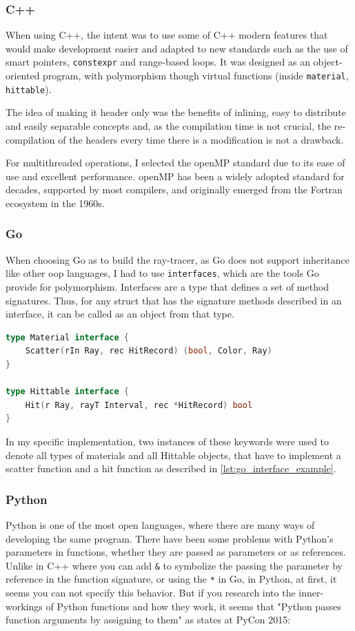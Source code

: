 \subsubsection{C++}
When using C++, the intent was to use some of C++ modern features that would make development easier and adapted to new standards such as the use of smart pointers, \texttt{constexpr} and range-based loops. It was designed as an object-oriented program, with polymorphism though virtual functions (inside \texttt{material}, \texttt{hittable}).

The idea of making it header only was the benefits of inlining, easy to distribute and easily separable concepts and, as the compilation time is not crucial, the re-compilation of the headers every time there is a modification is not a drawback.

For multithreaded operations, I selected the \gls{openMP} standard due to its ease of use and excellent performance. \gls{openMP} has been a widely adopted standard for decades, supported by most compilers, and originally emerged from the Fortran ecosystem in the 1960s.

\subsubsection{Go}
When choosing Go as to build the ray-tracer, as Go does not support inheritance like other \gls{oop} languages, I had to use \texttt{interfaces}, which are the tools Go provide for polymorphism. Interfaces are a type that defines a set of method signatures. Thus, for any struct that has the signature methods described in an interface, it can be called as an object from that type.

\begin{lstlisting}[language=Go, caption={Go interface example.}, label={lst:go_interface_example}
]
type Material interface {
	Scatter(rIn Ray, rec HitRecord) (bool, Color, Ray)
}

type Hittable interface {
	Hit(r Ray, rayT Interval, rec *HitRecord) bool
}
\end{lstlisting}

In my specific implementation, two instances of these keywords were used to denote all types of materials and all Hittable objects, that have to implement a scatter function and a hit function as described in \autoref{lst:go_interface_example}.

\subsubsection{Python}
Python is one of the most open languages, where there are many ways of developing the same program. There have been some problems with Python's parameters in functions, whether they are passed as parameters or as references. Unlike in C++ where you can add \texttt{\&} to symbolize the passing the parameter by reference in the function signature, or using the \texttt{*} in Go, in Python, at first, it seems you can not specify this behavior. But if you research into the inner-workings of Python functions and how they work, it seems that "Python passes function arguments by assigning to them" as \cite{python-names-pycon15} states at PyCon 2015:

